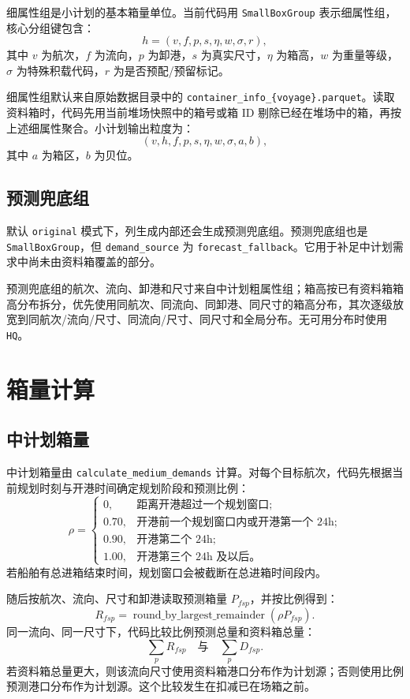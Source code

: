 \documentclass[UTF8,a4paper,11pt]{ctexart}
\newcommand{\code}[1]{\nolinkurl{#1}}
\begin{document}
细属性组是小计划的基本箱量单位。当前代码用 \code{SmallBoxGroup} 表示细属性组，核心分组键包含：
\[
h=(v,f,p,s,\eta,w,\sigma,r),
\]
其中 \(v\) 为航次，\(f\) 为流向，\(p\) 为卸港，\(s\) 为真实尺寸，\(\eta\) 为箱高，\(w\) 为重量等级，\(\sigma\) 为特殊积载代码，\(r\) 为是否预配/预留标记。

细属性组默认来自原始数据目录中的 \code{container_info_\{voyage\}.parquet}。读取资料箱时，代码先用当前堆场快照中的箱号或箱 ID 剔除已经在堆场中的箱，再按上述细属性聚合。小计划输出粒度为：
\[
(v,h,f,p,s,\eta,w,\sigma,a,b),
\]
其中 \(a\) 为箱区，\(b\) 为贝位。

\subsection{预测兜底组}

默认 \code{original} 模式下，列生成内部还会生成预测兜底组。预测兜底组也是 \code{SmallBoxGroup}，但 \code{demand_source} 为 \code{forecast_fallback}。它用于补足中计划需求中尚未由资料箱覆盖的部分。

预测兜底组的航次、流向、卸港和尺寸来自中计划粗属性组；箱高按已有资料箱箱高分布拆分，优先使用同航次、同流向、同卸港、同尺寸的箱高分布，其次逐级放宽到同航次/流向/尺寸、同流向/尺寸、同尺寸和全局分布。无可用分布时使用 \code{HQ}。

\section{箱量计算}

\subsection{中计划箱量}

中计划箱量由 \code{calculate_medium_demands} 计算。对每个目标航次，代码先根据当前规划时刻与开港时间确定规划阶段和预测比例：
\[
\rho=
\begin{cases}
0, & \text{距离开港超过一个规划窗口;}\\
0.70, & \text{开港前一个规划窗口内或开港第一个 24h;}\\
0.90, & \text{开港第二个 24h;}\\
1.00, & \text{开港第三个 24h 及以后。}
\end{cases}
\]
若船舶有总进箱结束时间，规划窗口会被截断在总进箱时间段内。

随后按航次、流向、尺寸和卸港读取预测箱量 \(P_{fsp}\)，并按比例得到：
\[
R_{fsp}=\operatorname{round\_by\_largest\_remainder}(\rho P_{fsp}).
\]
同一流向、同一尺寸下，代码比较比例预测总量和资料箱总量：
\[
\sum_p R_{fsp}
\quad\text{与}\quad
\sum_p D_{fsp}.
\]
若资料箱总量更大，则该流向尺寸使用资料箱港口分布作为计划源；否则使用比例预测港口分布作为计划源。这个比较发生在扣减已在场箱之前。
\end{document}

